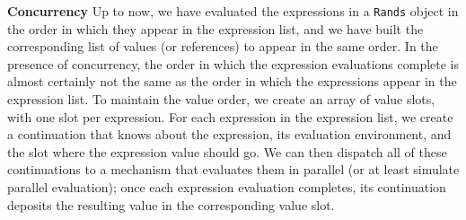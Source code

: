 \begin{minipage}[t]{\sw}
\slidenumber
\LARGE
{\bf Concurrency}\exx
Up to now, we have evaluated the expressions
in a \verb'Rands' object in the order
in which they appear in the expression list,
and we have built the corresponding list of values (or references)
to appear in the same order.\exx
In the presence of concurrency,
the order in which the expression evaluations complete
is almost certainly not the same
as the order in which the expressions appear in the expression list.\exx
To maintain the value order,
we create an array of value slots,
with one slot per expression.
For each expression in the expression list,
we create a continuation that knows about the expression,
its evaluation environment,
and the slot where the expression value should go.
We can then dispatch all of these continuations
to a mechanism that evaluates them in parallel
(or at least simulate parallel evaluation);
once each expression evaluation completes,
its continuation deposits the resulting value
in the corresponding value slot.\exx
\end{minipage}
